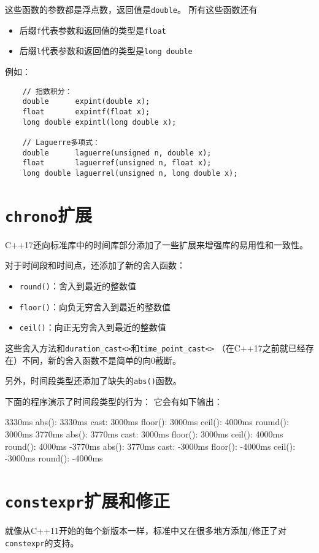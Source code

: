 这些函数的参数都是浮点数，返回值是\texttt{double}。
所有这些函数还有
\begin{itemize}
    \item 后缀\texttt{f}代表参数和返回值的类型是\texttt{float}
    \item 后缀\texttt{l}代表参数和返回值的类型是\texttt{long double}
\end{itemize}
例如：
\begin{lstlisting}
    // 指数积分：
    double      expint(double x);
    float       expintf(float x);
    long double expintl(long double x);

    // Laguerre多项式：
    double      laguerre(unsigned n, double x);
    float       laguerref(unsigned n, float x);
    long double laguerrel(unsigned n, long double x);
\end{lstlisting}

\section{\texttt{chrono}扩展}
C++17还向标准库中的时间库部分添加了一些扩展来增强库的易用性和一致性。

对于时间段和时间点，还添加了新的舍入函数：
\begin{itemize}
    \item \texttt{round()}：舍入到最近的整数值
    \item \texttt{floor()}：向负无穷舍入到最近的整数值
    \item \texttt{ceil()}：向正无穷舍入到最近的整数值
\end{itemize}
这些舍入方法和\texttt{duration\_cast<>}和\texttt{time\_point\_cast<>}
（在C++17之前就已经存在）不同，新的舍入函数不是简单的向0截断。

另外，时间段类型还添加了缺失的\texttt{abs()}函数。

下面的程序演示了时间段类型的行为：
它会有如下输出：
\begin{blacklisting}
    3330ms
      abs():   3330ms
      cast:    3000ms
      floor(): 3000ms
      ceil():  4000ms
      roumd(): 3000ms
    3770ms
      abs():   3770ms
      cast:    3000ms
      floor(): 3000ms
      ceil():  4000ms
      round(): 4000ms
    -3770ms
      abs():   3770ms
      cast:    -3000ms
      floor(): -4000ms
      ceil():  -3000ms
      round(): -4000ms
\end{blacklisting}

\section{\texttt{constexpr}扩展和修正}\label{ch28.5}
就像从C++11开始的每个新版本一样，标准中又在很多地方添加/修正了对\texttt{constexpr}的支持。

